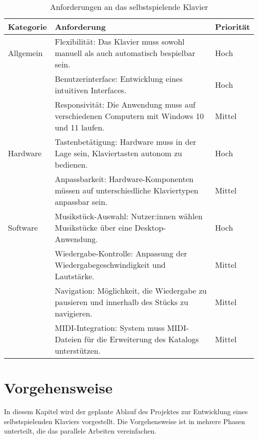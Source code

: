 \begin{table}[ht]
    \centering
    \begin{tabular}{ | m{2cm} | m{10cm}| m{2cm} | }
        \hline
        \textbf{Kategorie} & \textbf{Anforderung} & \textbf{Priorität} \\
        \hline
        Allgemein & Flexibilität: Das Klavier muss sowohl manuell als auch automatisch bespielbar sein. & Hoch \\
        \cline{2-3}
        & Benutzerinterface: Entwicklung eines intuitiven Interfaces. & Hoch \\
        \cline{2-3}
        & Responsivität: Die Anwendung muss auf verschiedenen Computern mit Windows 10 und 11 laufen. & Mittel \\
        \cline{2-3}
        \hline
        Hardware & Tastenbetätigung: Hardware muss in der Lage sein, Klaviertasten autonom zu bedienen. & Hoch \\
        \cline{2-3}
        & Anpassbarkeit: Hardware-Komponenten müssen auf unterschiedliche Klaviertypen anpassbar sein. & Mittel \\
        \hline
        Software & Musikstück-Auswahl: Nutzer:innen wählen Musikstücke über eine Desktop-Anwendung. & Hoch \\
        \cline{2-3}
        & Wiedergabe-Kontrolle: Anpassung der Wiedergabegeschwindigkeit und Lautstärke. & Mittel \\
        \cline{2-3}
        & Navigation: Möglichkeit, die Wiedergabe zu pausieren und innerhalb des Stücks zu navigieren. & Mittel \\
        \cline{2-3}
        & MIDI-Integration: System muss MIDI-Dateien für die Erweiterung des Katalogs unterstützen. & Mittel \\
        \hline
    \end{tabular}
    \caption{Anforderungen an das selbstspielende Klavier}
    \label{table:anforderungen}
\end{table}


\section{Vorgehensweise} \label{sec:zielstellung-vorgehen}

In diesem Kapitel wird der geplante Ablauf des Projektes zur Entwicklung eines selbstspielenden Klaviers vorgestellt.
Die Vorgehensweise ist in mehrere Phasen unterteilt, die das parallele Arbeiten vereinfachen.


